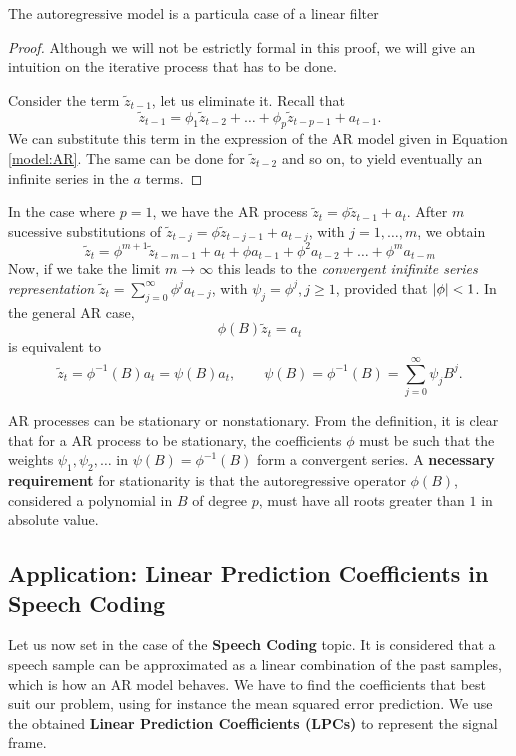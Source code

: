 \begin{nprop}
The autoregressive model is a particula case of a linear filter
\end{nprop}
\begin{proof}
  Although we will not be estrictly formal in this proof, we will give an intuition on the iterative process that has to be done.

  Consider the term \(\tilde z_{t-1}\), let us eliminate it. Recall that
  \[
    \tilde z_{t-1} = \phi_{1}\tilde z_{t-2} + \dots + \phi_{p} \tilde z_{t-p-1} + a_{t-1}.
  \]
  We can substitute this term in the expression of the AR model given in Equation \eqref{model:AR}. The same can be done for \(\tilde z_{t-2}\) and so on, to yield eventually an infinite series in the \(a\) terms.

\end{proof}

  In the case where \(p=1\), we have the AR process \(\tilde z_{t} = \phi \tilde z_{t-1} + a_{t}\). After \(m\) sucessive substitutions of \(\tilde z_{t-j} = \phi \tilde z_{t-j-1} + a_{t-j} \), with \(j = 1,\dots,m\), we obtain
  \[
    \tilde z_{t} = \phi^{m+1}\tilde z_{t-m-1}+ a_{t} + \phi a_{t-1} + \phi^{2}a_{t-2} + \dots + \phi^{m}a_{t-m}
  \]
  Now, if we take the limit \(m\to \infty\) this leads to the \emph{convergent inifinite series representation} \(\tilde z_{t} = \sum_{j=0}^{\infty}\phi^{j}a_{t-j}\), with \(\psi_{j} = \phi^{j}, j \geq 1\), provided that \(\left\lvert \phi \right\rvert < 1\). In the general AR case,
  \[
    \phi(B) \tilde z_{t} = a_{t}
  \]
  is equivalent to
  \[
    \tilde z_{t} = \phi^{-1}(B) a_{t} = \psi(B)a_{t}, \quad \quad \psi(B) = \phi^{-1}(B) = \sum_{j=0}^{\infty}\psi_{j}B^{j}.
  \]

  AR processes can be stationary or nonstationary. From the definition, it is clear that for a AR process to be stationary, the coefficients \(\phi\) must be such that the weights \(\psi_{1},\psi_{2},\dots\) in \(\psi(B) = \phi^{-1}(B)\) form a convergent series. A \textbf{necessary requirement} for stationarity is that the autoregressive operator \(\phi(B)\), considered a polynomial in \(B\) of degree \(p\), must have all roots greater than \(1\) in absolute value.

  \subsection{Application: Linear Prediction Coefficients in Speech Coding}


  Let us now set in the case of the \textbf{Speech Coding} topic. It is considered that a speech sample can be approximated as a linear combination of the past samples, which is how an AR model behaves. We have to find the coefficients that best suit our problem, using for instance the mean squared error prediction. We use the obtained \textbf{Linear Prediction Coefficients (LPCs)} to represent the signal frame.

